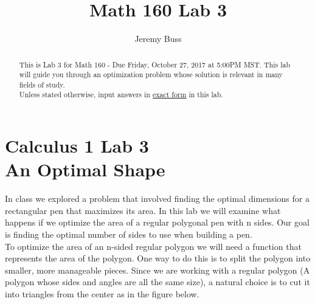 \documentclass[handout,nooutcomes]{ximera}
\title{Math 160 Lab 3}
\author{Jeremy Buss} %
\begin{document}
\section{Calculus 1 Lab 3 \\ An Optimal Shape}

\begin{abstract}
This is Lab 3 for Math 160 - Due Friday, October 27, 2017 at 5:00PM MST.
This lab will guide you through an optimization problem whose solution is relevant in many fields of study.\\

Unless stated otherwise, input answers in \underline{exact form} in this lab.
\end{abstract}

\maketitle

\hspace{2cm}In class we explored a problem that involved finding the optimal dimensions for a rectangular pen that maximizes its area. In this lab we will examine what happens if we optimize the area of a regular polygonal pen with n sides. Our goal is finding the optimal number of sides to use when building a pen.\\

\medskip
\hspace{2cm}To optimize the area of an n-sided regular polygon we will need a function that represents the area of the polygon. One way to do this is to split the polygon into smaller, more manageable pieces. Since we are working with a regular polygon (A polygon whose sides and angles are all the same size), a natural choice is to cut it into triangles from the center as in the figure below.

\end{document}
